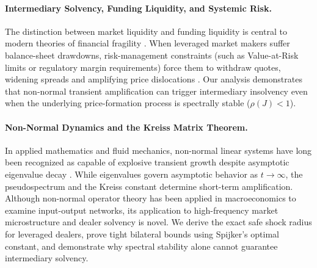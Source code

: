 \documentclass[12pt]{article}
\theoremstyle{definition}
\theoremstyle{remark}
\begin{document}
\paragraph{Intermediary Solvency, Funding Liquidity, and Systemic Risk.}
The distinction between market liquidity and funding liquidity is central to modern theories of financial fragility \citep{brunnermeier2009,adrian2010liquidity,he2013intermediary}. When leveraged market makers suffer balance-sheet drawdowns, risk-management constraints (such as Value-at-Risk limits or regulatory margin requirements) force them to withdraw quotes, widening spreads and amplifying price dislocations \citep{greenwood2015vulnerable,eisenberg2001systemic}. Our analysis demonstrates that non-normal transient amplification can trigger intermediary insolvency even when the underlying price-formation process is spectrally stable ($\rho(J) < 1$).

\paragraph{Non-Normal Dynamics and the Kreiss Matrix Theorem.}
In applied mathematics and fluid mechanics, non-normal linear systems have long been recognized as capable of explosive transient growth despite asymptotic eigenvalue decay \citep{kreiss1962,spijker1991,trefethen2005spectra}. While eigenvalues govern asymptotic behavior as $t \to \infty$, the pseudospectrum and the Kreiss constant determine short-term amplification. Although non-normal operator theory has been applied in macroeconomics to examine input-output networks, its application to high-frequency market microstructure and dealer solvency is novel. We derive the exact safe shock radius for leveraged dealers, prove tight bilateral bounds using Spijker's optimal constant, and demonstrate why spectral stability alone cannot guarantee intermediary solvency.
\end{document}

